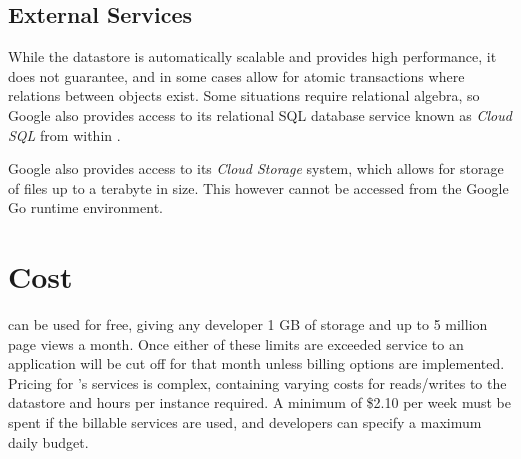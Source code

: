 \subsection{External Services}
While the datastore is automatically scalable and provides high performance, it does not guarantee, and in some cases allow for atomic transactions where relations between objects exist. Some situations require relational algebra, so Google also provides access to its relational SQL database service known as \emph{Cloud SQL} from within \gae{}\ftGAETwo. 

Google also provides access to its \emph{Cloud Storage} system, which allows for storage of files up to a terabyte in size. This however cannot be accessed from the Google Go runtime environment\ftGAETwo.

\section{Cost}
\gae{} can be used for free, giving any developer 1 GB of storage and up to 5 million page views a month. Once either of these limits are exceeded service to an application will be cut off for that month unless billing options are implemented. Pricing for \gae{}'s services is complex, containing varying costs for reads/writes to the datastore and hours per instance required. A minimum of \$2.10 per week must be spent if the billable services are used, and developers can specify a maximum daily budget\ftGAEFive.\ftGAEFiveText
